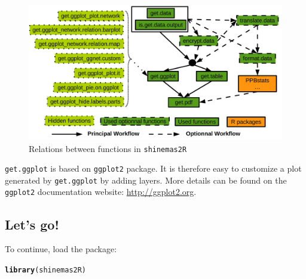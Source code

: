\documentclass{article}\usepackage[]{graphicx}\usepackage[]{color}
\makeatletter
\newcommand{\hlstd}[1]{\textcolor[rgb]{0.345,0.345,0.345}{#1}}%
\newcommand{\hlkwd}[1]{\textcolor[rgb]{0.737,0.353,0.396}{\textbf{#1}}}%
\newenvironment{kframe}{%
 \def\at@end@of@kframe{}%
 \ifinner\ifhmode%
  \def\at@end@of@kframe{\end{minipage}}%
  \begin{minipage}{\columnwidth}%
 \fi\fi%
 \def\FrameCommand##1{\hskip\@totalleftmargin \hskip-\fboxsep
 \colorbox{shadecolor}{##1}\hskip-\fboxsep
     \hskip-\linewidth \hskip-\@totalleftmargin \hskip\columnwidth}%
 \MakeFramed {\advance\hsize-\width
   \@totalleftmargin\z@ \linewidth\hsize
   \@setminipage}}%
 {\par\unskip\endMakeFramed%
 \at@end@of@kframe}
\newenvironment{knitrout}{}{} %
\newcommand{\pack}{\texttt{shinemas2R}}
\makeatother
\begin{document}
\begin{figure}[H]
\begin{center}
%
\includegraphics[width=\textwidth]{shinemas2R_function_relations}
\end{center}
\caption{Relations between functions in \pack}
\label{function_relations}
\end{figure}

\texttt{get.ggplot} is based on \texttt{ggplot2} package.
It is therefore easy to customize a plot generated by \texttt{get.ggplot} by adding layers.
More details can be found on the \texttt{ggplot2} documentation website: \url{http://ggplot2.org}.

\subsection{Let’s go!}

To continue, load the package:
\begin{knitrout}
\color{fgcolor}\begin{kframe}
\begin{alltt}
\hlkwd{library}\hlstd{(shinemas2R)}
\end{alltt}
\end{kframe}
\end{knitrout}
\end{document}

